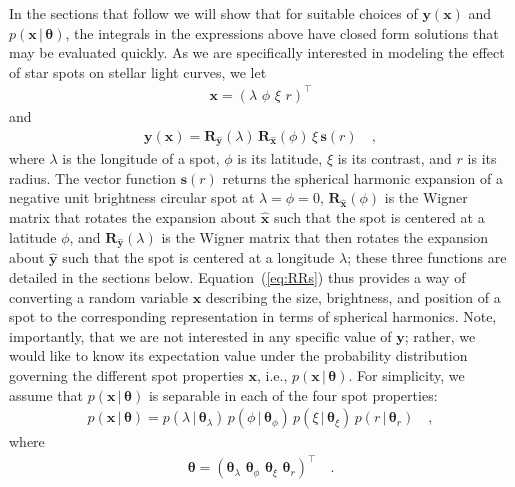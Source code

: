 \documentclass[modern]{aastex62}
\begin{document}
In the sections that follow we will show that for suitable choices of $\mathbf{y}(\mathbf{x})$
and $p(\mathbf{x} \, \big| \, \pmb{\theta})$, the integrals in the expressions
above have closed form solutions that may be evaluated quickly.
%
As we are specifically interested in modeling the effect of star spots
on stellar light curves, we let
%
\begin{align}
    \mathbf{x} = \left( \lambda \,\, \phi \,\, \xi \,\, r \right)^\top
\end{align}
%
and
%
\begin{align}
    \label{eq:RRs}
    \mathbf{y}(\mathbf{x}) =
    \mathbf{R}_{\hat{\mathbf{y}}}(\lambda)
    \,
    \mathbf{R}_{\hat{\mathbf{x}}}(\phi)
    \,
    \xi
    \,
    \mathbf{s}(r)
    \quad,
\end{align}
%
where $\lambda$ is the longitude of a spot, $\phi$ is its latitude, $\xi$
is its contrast, and $r$ is its radius. The vector function $\mathbf{s}(r)$
returns the spherical harmonic expansion of a negative unit brightness
circular spot at $\lambda = \phi = 0$,
$\mathbf{R}_{\hat{\mathbf{x}}}(\phi)$ is the Wigner matrix that rotates the
expansion about $\hat{\mathbf{x}}$ such that the spot is centered at a
latitude $\phi$, and $\mathbf{R}_{\hat{\mathbf{y}}}(\lambda)$ is the Wigner
matrix that then rotates the
expansion about $\hat{\mathbf{y}}$ such that the spot is centered at a
longitude $\lambda$; these three functions are detailed in the sections below.
%
Equation~(\ref{eq:RRs}) thus provides a way of converting a random variable
$\mathbf{x}$ describing the size, brightness, and position of a spot to the
corresponding representation in terms of spherical harmonics.
%
Note, importantly, that we are not interested in any specific value of
$\mathbf{y}$; rather, we would like to know its expectation value under
the probability distribution governing the different spot properties $\mathbf{x}$,
i.e., $p(\mathbf{x} \, \big| \, \pmb{\theta})$.
%
For simplicity, we assume that $p(\mathbf{x} \, \big| \, \pmb{\theta})$
is separable in each of the four spot properties:
%
\begin{align}
    p(\mathbf{x} \, \big| \, \pmb{\theta})
    =
    p(\lambda \, \big| \, \pmb{\theta}_{\lambda}) \,
    p(\phi \, \big| \, \pmb{\theta}_{\phi})\,
    p(\xi \, \big| \, \pmb{\theta}_{\xi}) \,
    p(r \, \big| \, \pmb{\theta}_{r})
    \quad,
\end{align}
%
where
%
\begin{align}
    \pmb{\theta} = \left(
    \pmb{\theta}_{\lambda} \, \,
    \pmb{\theta}_{\phi} \, \,
    \pmb{\theta}_{\xi} \, \,
    \pmb{\theta}_{r} \right)^\top
    \quad.
\end{align}
\end{document}
